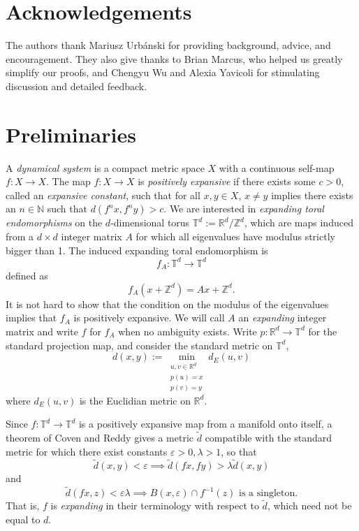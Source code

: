 \documentclass{article}
\def\N{\mathbb{N}}
\def\R{\mathbb{R}}
\def\Z{\mathbb{Z}}
\def\T{\mathbb{T}}
\begin{document}
\section*{Acknowledgements}

The authors thank Mariusz Urbánski for providing background, advice, and encouragement. They also give thanks to Brian Marcus, who helped us greatly simplify our proofs, and Chengyu Wu and Alexia Yavicoli for stimulating discussion and detailed feedback. 

\section{Preliminaries} \label{Section:Prelims}


A \textit{dynamical system} is a compact metric space $X$ with a continuous self-map $f:X\to X$. The map $f:X\to X$ is \textit{positively expansive} if there exists some $c>0$, called an \textit{expansive constant},  such that for all $x,y\in X$, $x\neq y$ implies there exists an $n\in \N$ such that $d(f^nx,f^ny)>c$. We are interested in \textit{expanding toral endomorphisms} on the $d$-dimensional torus $\T^d:= \R^d/\Z^d$, which are maps induced from a $d\times d$ integer matrix $A$ for which all eigenvalues have modulus strictly bigger than 1. The induced expanding toral endomorphism is $$f_A:\T^d\to\T^d$$ defined as $$f_A(x+\Z^d)=Ax+\Z^d.$$ It is not hard to show that the condition on the modulus of the eigenvalues implies that $f_A$ is positively expansive. We will call $A$ an \textit{expanding} integer matrix and write $f$ for $f_A$ when no ambiguity exists. Write $p:\R^d\to\T^d$ for the standard projection map, and consider the standard metric on $\T^d$, $$d(x,y):=\min_{\substack{u,v\in \R^d \\ p(u)=x \\p(v)=y}} d_E(u,v)$$ where $d_E(u,v)$ is the Euclidian metric on $\R^d$.

Since $f:\T^d\to \T^d$ is a positively expansive map from a manifold onto itself, a theorem of Coven and Reddy \cite{CR} gives a metric $\tilde{d}$ compatible with the standard metric for which there exist constants $\varepsilon>0,\lambda >1$, so that \begin{equation*}
    \tilde d(x,y)<\varepsilon \implies \tilde d(fx,fy)>\lambda \tilde d(x,y)
\end{equation*} 
and \begin{equation*}
    \tilde d(fx,z)<\varepsilon\lambda \implies B(x,\varepsilon)\cap f^{-1}(z) \text{ is a singleton.}
\end{equation*} That is, $f$ is \textit{expanding} in their terminology with respect to $\tilde{d}$, which need not be equal to $d$. 
\end{document}
